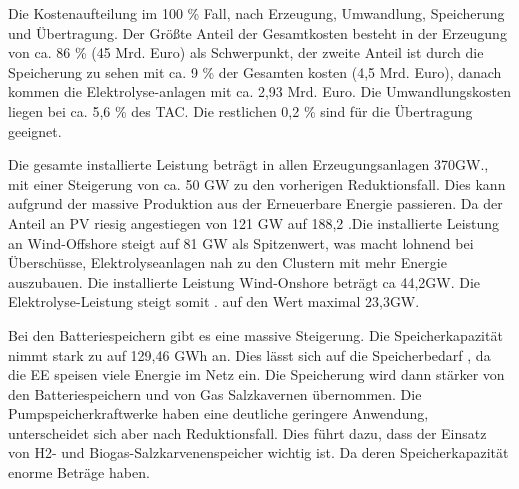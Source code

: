 Die Kostenaufteilung im 100 \% Fall, nach Erzeugung, Umwandlung, Speicherung und Übertragung. Der Größte Anteil der Gesamtkosten besteht in der Erzeugung von ca. 86 \% (45 Mrd. Euro) als Schwerpunkt, der zweite Anteil ist durch die Speicherung zu sehen mit ca. 9 \% der Gesamten kosten (4,5 Mrd. Euro), danach kommen die Elektrolyse-anlagen mit ca. 2,93 Mrd. Euro. Die Umwandlungskosten liegen bei ca. 5,6 \% des TAC. Die restlichen 0,2 \% sind für die Übertragung geeignet.

Die gesamte installierte Leistung beträgt in allen Erzeugungsanlagen 370GW., mit einer Steigerung von ca. 50 GW zu den vorherigen Reduktionsfall. Dies kann aufgrund der massive Produktion aus der Erneuerbare Energie passieren. Da der Anteil an PV riesig angestiegen von 121 GW auf 188,2 .Die installierte Leistung an Wind-Offshore steigt  auf 81 GW als Spitzenwert, was macht lohnend bei Überschüsse, Elektrolyseanlagen nah zu den Clustern mit mehr Energie auszubauen.  Die installierte Leistung Wind-Onshore beträgt ca 44,2GW. Die Elektrolyse-Leistung steigt somit . auf den Wert maximal  23,3GW.

Bei den Batteriespeichern gibt es eine massive Steigerung. Die Speicherkapazität nimmt stark zu auf  129,46 GWh an. Dies lässt sich auf die Speicherbedarf , da die EE speisen viele Energie im Netz ein. Die Speicherung  wird dann stärker von den Batteriespeichern und von Gas Salzkavernen übernommen. Die Pumpspeicherkraftwerke haben eine deutliche geringere  Anwendung, unterscheidet sich aber nach Reduktionsfall. Dies führt dazu, dass der Einsatz von  H2- und Biogas-Salzkarvenenspeicher wichtig ist. Da deren Speicherkapazität enorme Beträge haben.

